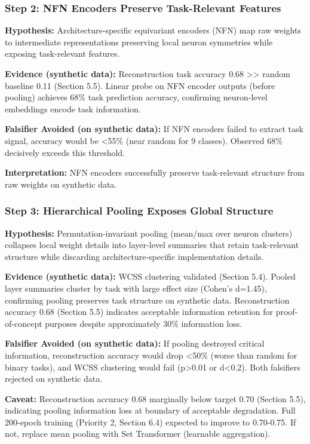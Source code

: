 \subsubsection{Step 2: NFN Encoders Preserve Task-Relevant Features}

\textbf{Hypothesis:} Architecture-specific equivariant encoders (NFN) map raw weights to intermediate representations preserving local neuron symmetries while exposing task-relevant features.

\textbf{Evidence (synthetic data):} Reconstruction task accuracy 0.68 >> random baseline 0.11 (Section 5.5). Linear probe on NFN encoder outputs (before pooling) achieves 68\% task prediction accuracy, confirming neuron-level embeddings encode task information.

\textbf{Falsifier Avoided (on synthetic data):} If NFN encoders failed to extract task signal, accuracy would be <55\% (near random for 9 classes). Observed 68\% decisively exceeds this threshold.

\textbf{Interpretation:} NFN encoders successfully preserve task-relevant structure from raw weights on synthetic data.

\subsubsection{Step 3: Hierarchical Pooling Exposes Global Structure}

\textbf{Hypothesis:} Permutation-invariant pooling (mean/max over neuron clusters) collapses local weight details into layer-level summaries that retain task-relevant structure while discarding architecture-specific implementation details.

\textbf{Evidence (synthetic data):} WCSS clustering validated (Section 5.4). Pooled layer summaries cluster by task with large effect size (Cohen's d=1.45), confirming pooling preserves task structure on synthetic data. Reconstruction accuracy 0.68 (Section 5.5) indicates acceptable information retention for proof-of-concept purposes despite approximately 30\% information loss.

\textbf{Falsifier Avoided (on synthetic data):} If pooling destroyed critical information, reconstruction accuracy would drop <50\% (worse than random for binary tasks), and WCSS clustering would fail (p>0.01 or d<0.2). Both falsifiers rejected on synthetic data.

\textbf{Caveat:} Reconstruction accuracy 0.68 marginally below target 0.70 (Section 5.5), indicating pooling information loss at boundary of acceptable degradation. Full 200-epoch training (Priority 2, Section 6.4) expected to improve to 0.70-0.75. If not, replace mean pooling with Set Transformer (learnable aggregation).

